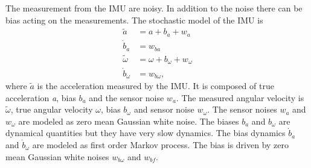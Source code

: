 The measurement from the IMU are noisy. In addition to the noise there can be bias acting on the measurements. The stochastic model of the IMU is 
\begin{equation}
\label{eq:imu_noise}
\begin{split}
\tilde{a} &= a + b_a + w_a \\
\dot{b}_a &= w_{ba} \\
\tilde{\omega} &= \omega + b_\omega + w_\omega \\
\dot{b}_\omega &= w_{b\omega},
\end{split}
\end{equation}
where $\tilde{a}$ is the acceleration measured by the IMU. It is composed of true acceleration \emph{a}, bias $b_a$ and the sensor noise $w_a$. The measured angular velocity is $\tilde{\omega}$, true angular velocity $\omega$, bias $b_{\omega}$ and sensor noise $w_\omega$. The sensor noises $w_a$ and $w_\omega$ are modeled as zero mean Gaussian white noise. The biases $b_a$ and $b_\omega$ are dynamical quantities but they have very slow dynamics. The bias dynamics $\dot{b}_a$ and $\dot{b}_\omega$ are modeled as first order Markov process. The bias is driven by zero mean Gaussian white noises $w_{b\omega}$ and $w_{bf}$.

